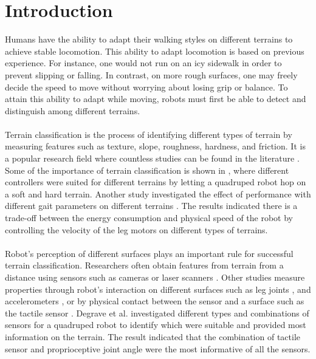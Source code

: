 \documentclass[USenglish]{ifimaster}  %
\begin{document}
	

\mainmatter{}
\pagestyle{MyStyle}
\chapter{Introduction}                  %
Humans have the ability to adapt their walking styles on different terrains to achieve stable locomotion. This ability to adapt locomotion is based on previous experience. For instance, one would not run on an icy sidewalk in order to prevent slipping or falling. In contrast, on more rough surfaces, one may freely decide the speed to move without worrying about losing grip or balance. To attain this ability to adapt while moving, robots must first be able to detect and distinguish among different terrains.
\\
\\
Terrain classification is the process of identifying different types of terrain by measuring features such as texture, slope, roughness, hardness, and friction. It is a popular research field where countless studies can be found in the literature  \cite{Giguere06environmentidentification,Giguere2009,6386243,6569179,4399500,littleDog}. Some of the importance of terrain classification is shown in \cite{7487541}, where different controllers were suited for different terrains by letting a quadruped robot hop on a soft and hard terrain. Another study investigated the effect of performance with different gait parameters on different terrains \cite{6569179}. The results indicated there is a trade-off between the energy consumption and physical speed of the robot by controlling the velocity of the leg motors on different types of terrains.
\\
\\ 
Robot's perception of different surfaces plays an important rule for successful terrain classification. Researchers often obtain features from terrain from a distance using sensors such as cameras \cite{littleDog} or laser scanners \cite{4651026}. Other studies measure properties through robot's interaction on different surfaces such as leg joints \cite{26b23e912c654fe4b7478fd910130195}, and accelerometers \cite{DBLP:conf/emcr/WeissFSZ07}, 
or by physical contact between the sensor and a surface such as the tactile sensor \cite{6784609,walastactile,7397881}. Degrave et al. \cite{6784609} investigated different types and combinations of sensors for a quadruped robot to identify which were suitable and provided most information on the terrain. The result indicated that the combination of tactile sensor and proprioceptive joint angle were the most informative of all the sensors. 
\end{document}
